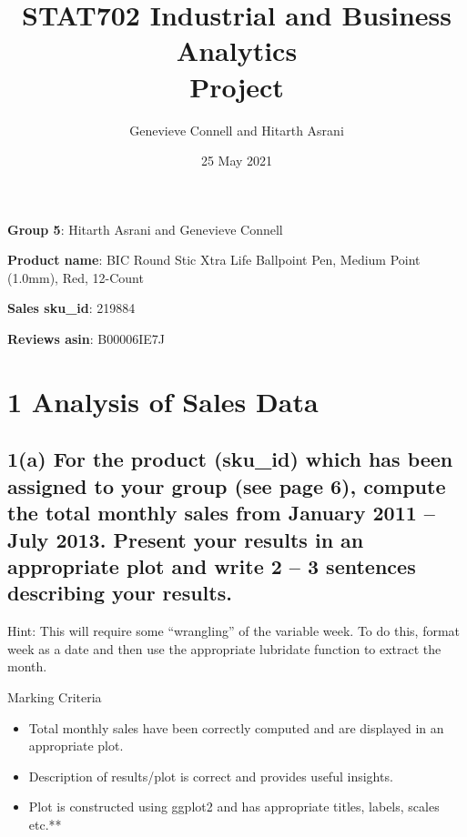 \documentclass[
  11pt,
]{article}
\title{STAT702 Industrial and Business Analytics\\
Project}
\author{Genevieve Connell and Hitarth Asrani}
\date{25 May 2021}
\begin{document}
\maketitle

\newpage

\textbf{Group 5}: Hitarth Asrani and Genevieve Connell

\textbf{Product name}: BIC Round Stic Xtra Life Ballpoint Pen, Medium
Point (1.0mm), Red, 12-Count

\textbf{Sales sku\_id}: 219884

\textbf{Reviews asin}: B00006IE7J

\hypertarget{analysis-of-sales-data}{%
\section{1 Analysis of Sales Data}\label{analysis-of-sales-data}}

\hypertarget{a-for-the-product-sku_id-which-has-been-assigned-to-your-group-see-page-6-compute-the-total-monthly-sales-from-january-2011-july-2013.-present-your-results-in-an-appropriate-plot-and-write-2-3-sentences-describing-your-results.}{%
\subsection{1(a) For the product (sku\_id) which has been assigned to
your group (see page 6), compute the total monthly sales from January
2011 -- July 2013. Present your results in an appropriate plot and write
2 -- 3 sentences describing your
results.}\label{a-for-the-product-sku_id-which-has-been-assigned-to-your-group-see-page-6-compute-the-total-monthly-sales-from-january-2011-july-2013.-present-your-results-in-an-appropriate-plot-and-write-2-3-sentences-describing-your-results.}}

Hint: This will require some ``wrangling'' of the variable week. To do
this, format week as a date and then use the appropriate lubridate
function to extract the month.

Marking Criteria

\begin{itemize}
\item
  Total monthly sales have been correctly computed and are displayed in
  an appropriate plot.
\item
  Description of results/plot is correct and provides useful insights.
\item
  Plot is constructed using ggplot2 and has appropriate titles, labels,
  scales etc.**
\end{itemize}
\end{document}
